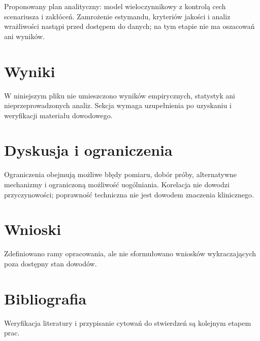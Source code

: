 \documentclass[11pt,a4paper]{article}
\begin{document}
Proponowany plan analityczny: model wieloczynnikowy z kontrolą cech scenariusza i zakłóceń. Zamrożenie estymandu, kryteriów jakości i analiz wrażliwości nastąpi przed dostępem do danych; na tym etapie nie ma oszacowań ani wyników.

\section{Wyniki}

W niniejszym pliku nie umieszczono wyników empirycznych, statystyk ani nieprzeprowadzonych analiz. Sekcja wymaga uzupełnienia po uzyskaniu i weryfikacji materiału dowodowego.

\section{Dyskusja i ograniczenia}

Ograniczenia obejmują możliwe błędy pomiaru, dobór próby, alternatywne mechanizmy i ograniczoną możliwość uogólniania. Korelacja nie dowodzi przyczynowości; poprawność techniczna nie jest dowodem znaczenia klinicznego.

\section{Wnioski}

Zdefiniowano ramy opracowania, ale nie sformułowano wniosków wykraczających poza dostępny stan dowodów.

\section*{Bibliografia}

Weryfikacja literatury i przypisanie cytowań do stwierdzeń są kolejnym etapem prac.
\end{document}
